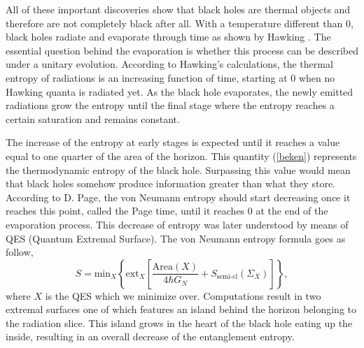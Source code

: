 All of these important discoveries show that black holes are thermal objects and therefore are not completely black after all. With a temperature different than 0, black holes radiate and evaporate through time as shown by Hawking \cite{Hawking1975}. The essential question behind the evaporation is whether this process can be described under a unitary evolution. According to Hawking's calculations, the thermal entropy of radiations is an increasing function of time, starting at 0 when no Hawking quanta is radiated yet. As the black hole evaporates, the newly emitted radiations grow the entropy until the final stage where the entropy reaches a certain saturation and remains constant.

The increase of the entropy at early stages is expected until it reaches a value equal to one quarter of the area of the horizon. This quantity (\ref{beken}) represents the thermodynamic entropy of the black hole. Surpassing this value would mean that black holes somehow produce information greater than what they store. According to D. Page\cite{PhysRevLett.71.3743}, the von Neumann entropy should start decreasing once it reaches this point, called the Page time, until it reaches 0 at the end of the evaporation process. This decrease of entropy was later understood by means of QES (Quantum Extremal Surface). The von Neumann entropy formula goes as follow\cite{almheiri2020entropy},
\begin{equation}
    S = \text{min}_X\left\{\text{ext}_X\left[\frac{\text{Area}\left(X\right)}{4\hbar G_N} + S_\text{semi-cl}\left(\Sigma_X\right)\right]\right\},
\end{equation}
where $X$ is the QES which we minimize over. Computations result in two extremal surfaces one of which features an island behind the horizon belonging to the radiation slice. This island grows in the heart of the black hole eating up the inside, resulting in an overall decrease of the entanglement entropy.

